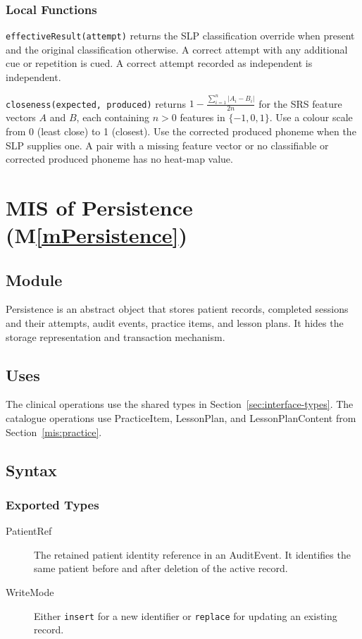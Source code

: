\documentclass[12pt, titlepage]{article}
\newcommand{\mref}[1]{M\ref{#1}}
\begin{document}
\subsubsection{Local Functions}
\texttt{effectiveResult(attempt)} returns the SLP classification override
when present and the original classification otherwise. A correct attempt
with any additional cue or repetition is cued. A correct attempt recorded as
independent is independent.

\noindent\texttt{closeness(expected, produced)} returns
$1 - \frac{\sum_{i=1}^{n}|A_i-B_i|}{2n}$ for the SRS feature vectors
$A$ and $B$, each containing $n>0$ features in $\{-1,0,1\}$.
Use a colour scale from 0 (least close) to 1 (closest). Use the corrected
produced phoneme when the SLP supplies one. A pair with a missing feature
vector or no classifiable or corrected produced phoneme has no heat-map
value.

\clearpage

\section{MIS of Persistence (\mref{mPersistence})} \label{mis:persistence}

\subsection{Module}
Persistence is an abstract object that stores patient records, completed
sessions and their attempts, audit events, practice items, and lesson plans.
It hides the storage representation and transaction mechanism.

\subsection{Uses}
The clinical operations use the shared types in
Section~\ref{sec:interface-types}. The catalogue operations use PracticeItem,
LessonPlan, and LessonPlanContent from Section~\ref{mis:practice}.

\subsection{Syntax}

\subsubsection{Exported Types}
\begin{description}
\item[PatientRef] The retained patient identity reference in an AuditEvent.
It identifies the same patient before and after deletion of the active record.
\item[WriteMode] Either \texttt{insert} for a new identifier or \texttt{replace}
for updating an existing record.
\end{description}
\end{document}
